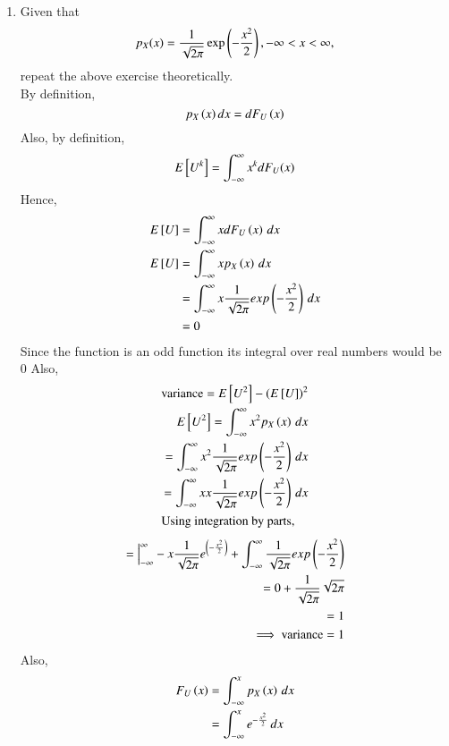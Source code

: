 \documentclass[journal,12pt,twocolumn]{IEEEtran}
\renewcommand\thesection{\arabic{section}}
\begin{document}
\begin{enumerate}[label=\thesection.\arabic*
,ref=\thesection.\theenumi]
\item Given that 
\begin{align}
p_{X}(x) = \frac{1}{\sqrt{2\pi}}\exp\left(-\frac{x^2}{2}\right), -\infty < x < \infty,
\end{align}
repeat the above exercise theoretically.\\
%
\solution
By definition,
\begin{equation}
    p_{X}\left(x\right)dx = dF_{U}\left(x\right)
\end{equation}
Also, by definition,
\begin{equation}
E{}\left[U^k\right] = \int_{-\infty}^{\infty}x^kdF_{U}(x)
\end{equation}
Hence,
\begin{align}
    E{}\left[U\right] &= \int_{-\infty}^{\infty} x dF_{U}\left(x\right) \,dx \\
    E{}\left[U\right] &= \int_{-\infty}^{\infty} x p_{X}\left(x\right) \,dx \\
               &= \int_{-\infty}^{\infty} x \frac{1}{\sqrt{2\pi}}exp\left(-\frac{x^2}{2}\right) \,dx \\
               &= 0 
\end{align}
Since the function is an odd function its integral over real numbers would be 0
Also,
\begin{align}
    \text{variance} = E{}\left[U^2\right] - \left(E{}\left[U\right]\right)^2\\
    E{}\left[U^2\right] =  \int_{-\infty}^{\infty} x^2 p_{X}\left(x\right) \,dx \\
                = \int_{-\infty}^{\infty} x^2 \frac{1}{\sqrt{2\pi}}exp\left(-\frac{x^2}{2}\right) \,dx \\
                = \int_{-\infty}^{\infty} x x\frac{1}{\sqrt{2\pi}}exp\left(-\frac{x^2}{2}\right) \,dx \\
                \intertext{Using integration by parts,} 
\end{align}
\begin{align}
                = \Big|_{-\infty}^{\infty}-x\frac{1}{\sqrt{2\pi}}e^{\left(-\frac{x^2}{2}\right)}  +  \int_{-\infty}^{\infty} \frac{1}{\sqrt{2\pi}}exp\left(-\frac{x^2}{2}\right) \\
                = 0 + \frac{1}{\sqrt{2\pi}}\sqrt{2\pi} \\
                = 1\\
    \implies \text{variance} = 1
\end{align}
Also,
\begin{align}
   F_{U}\left(x\right) &=  \int_{-\infty}^{x} p_{X}\left(x\right) \,dx  \\
                 &= \int_{-\infty}^{x} e^{-\frac{x^2}{2}}\,dx 
\end{align}
\end{enumerate}
\end{document}
